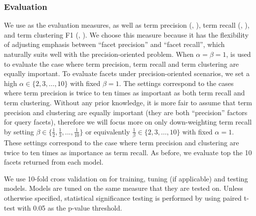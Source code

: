 \subsubsection{Evaluation}
We use \PRF as the evaluation measures, as well as term precision (\ie, \TP), term recall (\ie, \TR), and term clustering F1 (\ie, \PF). 
We choose this measure because it has the flexibility of adjusting emphasis between ``facet precision'' and ``facet recall'', which naturally suits well with the precision-oriented problem.
When $\alpha\!=\!\beta=\!1\!$,  is used to evaluate the case where term precision, term recall and term clustering are equally important. To evaluate facets under precision-oriented scenarios, we set a high $\alpha \in \{2, 3, \dots, 10\}$ with fixed $\beta\!=\!1$. The settings correspond to the cases where term precision is twice to ten times as important as both term recall and term clustering. Without any prior knowledge, it is more fair to assume that term precision and clustering are equally important (they are both ``precision'' factors for query facets), therefore we will focus more on only down-weighting term recall by setting $\beta \in \{\frac{1}{2}, \frac{1}{3}, ..., \frac{1}{10}\}$ or equivalently $\frac{1}{\beta} \in \{2, 3, \dots, 10\}$ with fixed $\alpha\!=\!1$. These settings correspond to the case where term precision and clustering are twice to ten times as importance as term recall. As before, we evaluate top the 10 facets returned from each model.

We use 10-fold cross validation on \DQF for training, tuning (if applicable) and testing models. Models are tuned on the same \PRF measure that they are tested on. Unless otherwise specified, statistical significance testing is performed by using paired t-test with 0.05 as the p-value threshold.


